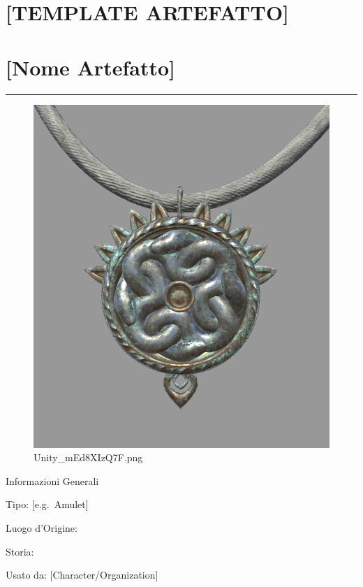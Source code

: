 \section{{[}TEMPLATE ARTEFATTO{]}}\label{template-artefatto}

\section{{[}Nome Artefatto{]}}\label{nome-artefatto}

\begin{center}\rule{0.5\linewidth}{0.5pt}\end{center}

\begin{figure}
\centering
\includegraphics{Unity_mEd8XIzQ7F.png}
\caption{Unity\_mEd8XIzQ7F.png}
\end{figure}

Informazioni Generali

Tipo: {[}e.g.~Amulet{]}

Luogo d'Origine:

Storia:

Usato da: {[}Character/Organization{]}


